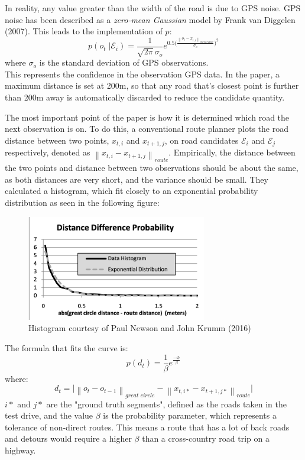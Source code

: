 \documentclass[12pt,a4paper]{report}
\begin{document}
In reality, any value greater than the width of the road is due to GPS noise. GPS noise has been described as a \textit{zero-mean Gaussian} model by Frank van Diggelen (2007).
This leads to the implementation of $p$:
\[
	p(o_t \;| \mathcal{E}_i) = \frac{1}{\sqrt{2\pi}\sigma_o}e^{0.5\bigg(\frac{\left\|o_t - x_{t,i}\right\|_{\textit{haversine}}}{\sigma_o}\bigg)^2}
\]
where $\sigma_o$ is the standard deviation of GPS observations.\\
This represents the confidence in the observation GPS data.
In the paper, a maximum distance is set at 200m, so that any road that's closest point is further than 200m away is automatically discarded to reduce the candidate quantity.

The most important point of the paper is how it is determined which road the next observation is on. To do this, a conventional route planner plots the road distance between
two points, $x_{t,i}$ and $x_{t+1,j}$, on road candidates $\mathcal{E}_i$ and $\mathcal{E}_j$ respectively, denoted as $\left\|x_{t,i} - x_{t+1,j}\right\|_{\textit{route}}$. Empirically, the distance between the two points and distance between two observations
should be about the same, as both distances are very short, and the variance should be small. They calculated a histogram, which fit closely to an exponential probability distribution as seen in the following figure:

\begin{figure}[h!]
	\centering
	\includegraphics[width=0.7\textwidth]{histogram.png}
	\caption{Histogram courtesy of Paul Newson and John Krumm (2016)}
\end{figure}

The formula that fits the curve is:
\[
	p(d_t) = \frac{1}{\beta}e^{\frac{-d_t}{\beta}}
\]
where:
\[
	d_t = \bigg | \left\|o_t - o_{t-1}\right\|_{\textit{great circle}} - \left\|x_{t,i*} - x_{t+1,j*}\right\|_{\textit{route}}\bigg |
\]
$i*$ and $j*$ are the "ground truth segments", defined as the roads taken in the test drive, and the value $\beta$ is the probability parameter, which represents a tolerance of non-direct routes.
This means a route that has a lot of back roads and detours would require a higher $\beta$ than a cross-country road trip on a highway.
\end{document}
